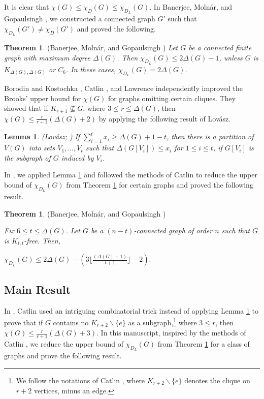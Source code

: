 \documentclass[12pt,reqno,a4paper]{amsart}
\theoremstyle{definition}
\newtheorem{thm}[defn]{Theorem}
\newtheorem{lem}[defn]{Lemma}
\begin{document}
It is clear that $\chi(G)\leq \chi_{D}(G) \leq \chi_{D_{L}}(G)$. In Banerjee, Moln\'{a}r, and Gopaulsingh \cite[Section 1.1]{BMG2025}, we constructed a connected graph $G'$ such that $\chi_{D_L}(G')\neq \chi_D(G')$ and proved the following.

\begin{thm}\label{Theorem 1.4}
{(Banerjee, Moln\'{a}r, and Gopaulsingh \cite[Theorem 3.1]{BMG2025})} 
{\em Let $G$ be a connected finite graph with maximum degree $\Delta(G)$. Then $\chi_{D_{L}}(G)\leq 2\Delta(G)-1$, unless $G$ 
is $K_{\Delta(G),\Delta(G)}$ or $C_6$. In these cases, $\chi_{D_{L}}(G) = 2\Delta(G)$. } 
\end{thm}
 
Borodin and Kostochka \cite{BK1977}, Catlin \cite{Cat1978}, and Lawrence \cite{Law1978} independently improved the Brooks' upper bound for $\chi (G)$ for graphs omitting certain cliques.  
They showed that if $K_{r+1} \not\subseteq G$, where $3 \leq r \leq \Delta(G)$, then $\chi(G) \leq \frac{r}{r+1}(\Delta(G) + 2)$ by applying the following result of Lov\'{a}sz.

\begin{lem}\label{Lemma 1.5}{\em (Lov\'{a}sz; \cite{Lov1966})}
{\em If $\sum_{i=1}^{t} x_{i}\geq \Delta(G)+1-t$, then there is a partition of $V(G)$ into sets $V_{1},...,V_{t}$ such that $\Delta(G[V_{i}])\leq x_{i}$ for $1\leq i\leq t$, if $G[V_{i}]$ is the subgraph of $G$ induced by $V_{i}$.}    
\end{lem}

In \cite{BMG2025}, we applied Lemma \ref{Lemma 1.5} and followed the methods of Catlin \cite{Cat1978} to reduce the upper bound of $\chi_{D_{L}}(G)$ from Theorem \ref{Theorem 1.4} for certain graphs and proved the following result.

\begin{thm}\label{Theorem 1.6}
{(Banerjee, Moln\'{a}r, and Gopaulsingh \cite[Theorem 4.3]{BMG2025})} 
{\em Fix $6\leq t\leq \Delta(G)$. Let $G$ be a $(n-t)$-connected graph of order $n$ such that $G$ is $K_{t,t}$-free.
Then, 
\begin{center}
$\chi_{D_{L}}(G)\leq 2\Delta(G)-  (3\lfloor\frac{(\Delta(G)+1)}{t+1}\rfloor-2)$.    
\end{center}
}
\end{thm}

\subsection{Main Result} In \cite{Cat1978a}, Catlin used an intriguing combinatorial trick instead of applying Lemma \ref{Lemma 1.5} to prove that if $G$ contains no $K_{r+2}\backslash \{e\}$ as a subgraph,\footnote{We follow the notations of Catlin \cite{Cat1978a}, where $K_{r+2}\backslash \{e\}$ denotes the clique on $r+2$ vertices, minus an edge.} where $3\leq r$, then $\chi(G)\leq \frac{r}{r+1}(\Delta(G)+3)$.
In this manuscript, inspired by the methods of Catlin \cite{Cat1978a}, we reduce the upper bound of $\chi_{D_{L}}(G)$ from Theorem \ref{Theorem 1.4} for a class of graphs and prove the following result.
\end{document}
